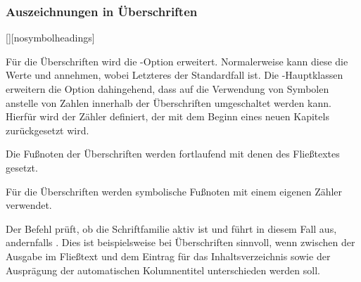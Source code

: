 \subsubsection{Auszeichnungen in Überschriften}
\begin{Declaration}{[\PSet]}[nosymbolheadings]%
\begin{Declaration}[v2.02]{}%
\printdeclarationlist%
%
%
Für die Überschriften wird die \KOMAScript-Option  erweitert.
Normalerweise kann diese die Werte  und  
annehmen, wobei Letzteres der Standardfall ist. Die \TUDScript-Hauptklassen 
erweitern die Option dahingehend, dass auf die Verwendung von Symbolen anstelle 
von Zahlen innerhalb der Überschriften umgeschaltet werden kann. Hierfür wird 
der Zähler  definiert, der mit dem Beginn eines neuen 
Kapitels zurückgesetzt wird.
%
\begin{values}
\item[nosymbolheadings/numberheadings]
  Die Fußnoten der Überschriften werden fortlaufend mit denen des Fließtextes 
  gesetzt.
\item[symbolheadings]
  Für die Überschriften werden symbolische Fußnoten mit einem eigenen Zähler 
  verwendet.
\end{values}
\end{Declaration}
\end{Declaration}

\begin{Declaration}{}%
\printdeclarationlist%
%
%
Der Befehl  prüft, ob die Schriftfamilie \DIN aktiv ist und führt 
in diesem Fall  aus, andernfalls . 
Dies ist beispielsweise bei Überschriften sinnvoll, wenn zwischen der Ausgabe 
im Fließtext und dem Eintrag für das Inhaltsverzeichnis sowie der Ausprägung 
der automatischen Kolumnentitel unterschieden werden soll.
\end{Declaration}

